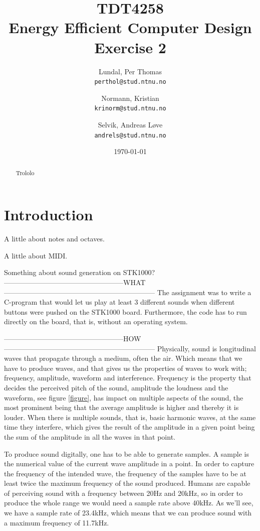 \documentclass[a4paper,12pt]{article}
\title{TDT4258 \\ Energy Efficient Computer Design \\ Exercise 2}
\author{
    Lundal, Per Thomas \\ \texttt{perthol@stud.ntnu.no}
    \and
    Normann, Kristian \\ \texttt{krinorm@stud.ntnu.no}
    \and
    Selvik, Andreas Løve \\ \texttt{andrels@stud.ntnu.no}
}
\date{\today}
\begin{document}
\maketitle

\begin{abstract}

Trololo

\end{abstract}

\clearpage
\tableofcontents

\clearpage
\section{Introduction}



A little about notes and octaves. 

A little about MIDI.

Something about sound generation on STK1000?
---------------------------------------------------WHAT-----------------------------------------------------------------
The assignment was to write a C-program that would let us play at least 3 different sounds when different buttons were pushed on the STK1000 board. Furthermore, the code has to run directly on the board, that is, without an operating system.  


---------------------------------------------------HOW-----------------------------------------------------------------
Physically, sound is longitudinal waves that propagate through a medium, often the air. Which means that we have to produce waves, and that gives us the properties of waves to work with; frequency, amplitude, waveform and interference. Frequency is the property that decides the perceived pitch of the sound,  amplitude the loudness and the waveform, see figure \ref{figure}, has impact on multiple aspects of the sound, the most prominent being that the average amplitude is higher and thereby it is louder. When there is multiple sounds, that is, basic harmonic waves, at the same time they interfere, which gives the result of the amplitude in a given point being the sum of the amplitude in all the waves in that point. 

To produce sound digitally, one has to be able to generate samples. A sample is the numerical value of the current wave amplitude in a point. In order to capture the frequency of the intended wave, the frequency of the samples have to be at least twice the maximum frequency of the sound produced. Humans are capable of perceiving sound with a frequency between 20Hz and 20kHz, so in order to produce the whole range we would need a sample rate above 40kHz. As we’ll see, we have a sample rate of 23.4kHz, which means that we can produce sound with a maximum frequency of 11.7kHz. 
\end{document}
